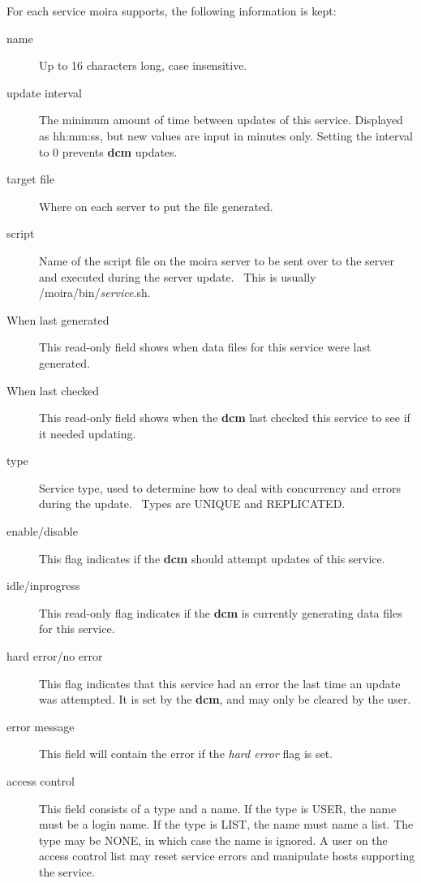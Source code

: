\documentclass{book}
\begin{document}
For each service moira supports, the following information is kept:
\begin{description}
\item[name] Up to 16 characters long, case insensitive.
\item[update interval] The minimum amount of time between updates of this
service.  Displayed as hh:mm:ss, but new values are input in minutes
only.  Setting the interval to 0 prevents {\bf dcm} updates.
\item[target file] Where on each server to put the file generated.
\item[script] Name of the script file on the moira server to be sent over to
the server and executed during the server update.  \athena\ This is
usually /moira/bin/{\em service}.sh.
\item[When last generated] This read-only field shows when data files for
this service were last generated.
\item[When last checked] This read-only field shows when the {\bf dcm} last
checked this service to see if it needed updating.
\item[type] Service type, used to determine how to deal with concurrency and
errors during the update.  \athena\ Types are UNIQUE and REPLICATED.
\item[enable/disable] This flag indicates if the {\bf dcm} should attempt
updates of this service.
\item[idle/inprogress] This read-only flag indicates if the {\bf dcm} is
currently generating data files for this service. 
\item[hard error/no error] This flag indicates that this service had an
error the last time an update was attempted.  It is set by the
{\bf dcm}, and may only be cleared by the user.
\item[error message] This field will contain the error if the {\em hard error}
flag is set.
\item[access control] This field consists of a type and a name.  If the type
is USER, the name must be a login name.  If the type is LIST, the name
must name a list.  The type may be NONE, in which case the name is
ignored.  A user on the access control list may reset service errors
and manipulate hosts supporting the service.
\end{description}
\end{document}
